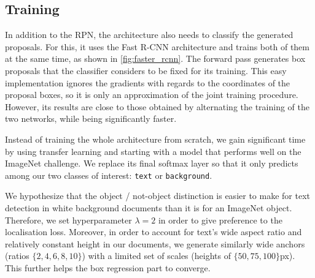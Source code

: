 	\subsection{Training}\label{sec:frcnn_train}
		In addition to the RPN, the \FRCNN{} architecture also needs to classify the generated proposals. For this, it uses the Fast R-CNN architecture and trains both of them at the same time, as shown in \autoref{fig:faster_rcnn}. The forward pass generates box proposals that the classifier considers to be fixed for its training. This easy implementation ignores the gradients with regards to the coordinates of the proposal boxes, so it is only an approximation of the joint training procedure. However, its results are close to those obtained by alternating the training of the two networks, while being significantly faster.

		Instead of training the whole architecture from scratch, we gain significant time by using transfer learning and starting with a model that performs well on the ImageNet challenge. We replace its final softmax layer so that it only predicts among our two classes of interest: \texttt{text} or \texttt{background}.

		We hypothesize that the object / not-object distinction is easier to make for text detection in white background documents than it is for an ImageNet object. Therefore, we set hyperparameter \(\lambda = 2\) in order to give preference to the localisation loss. Moreover, in order to account for text's wide aspect ratio and relatively constant height in our documents, we generate similarly wide anchors (ratios \(\{2, 4, 6, 8, 10\}\)) with a limited set of scales (heights of \(\{50, 75, 100\}\)px). This further helps the box regression part to converge.

